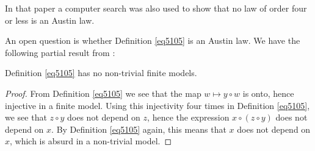 In that paper a computer search was also used to show that no law of order four or less is an Austin law.

An open question is whether Definition \ref{eq5105} is an Austin law.  We have the following partial result from \cite{Kisielewicz2}:

\begin{theorem}\leanok\label{5105-nontrivial} Definition \ref{eq5105} has no non-trivial finite models.
\end{theorem}

\begin{proof} \leanok From Definition \ref{eq5105} we see that the map $w \mapsto y \circ w$ is onto, hence injective in a finite model.  Using this injectivity four times in Definition \ref{eq5105}, we see that $z \circ y$ does not depend on $z$, hence the expression
$x \circ (z \circ y)$ does not depend on $x$.  By Definition \ref{eq5105} again, this means that $x$ does not depend on $x$, which is absurd in a non-trivial model.
\end{proof}
